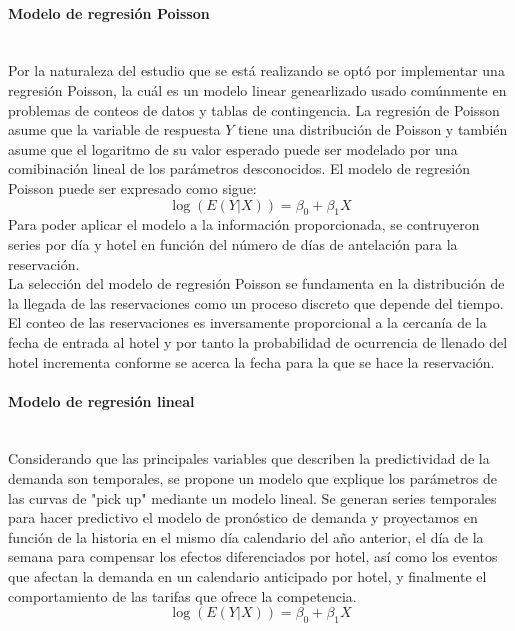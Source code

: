 \documentclass{article}\usepackage[]{graphicx}\usepackage[]{color}
\begin{document}
\paragraph{Modelo de regresión Poisson} ~\\
Por la naturaleza del estudio que se está realizando se optó por implementar una regresión Poisson, la cuál es un modelo linear genearlizado usado comúnmente en problemas de conteos de datos y tablas de contingencia. La regresión de Poisson asume que la variable de respuesta $Y$ tiene una distribución de Poisson y también asume que el logaritmo de su valor esperado puede ser modelado por una comibinación lineal de los parámetros desconocidos.
El modelo de regresión Poisson puede ser expresado como sigue:
$$\log(E(Y|X))=\beta_0 + \beta_1{X}$$
Para poder aplicar el modelo a la información proporcionada, se contruyeron series por día y hotel en función del número de días de antelación para la reservación.
~\\
La selección del modelo de regresión Poisson se fundamenta en la distribución de la llegada de las reservaciones como un proceso discreto que depende del tiempo. El conteo de las reservaciones es inversamente proporcional a la cercanía de la fecha de entrada al hotel y por tanto la probabilidad de ocurrencia de llenado del hotel incrementa conforme se acerca la fecha para la que se hace la reservación.

\paragraph{Modelo de regresión lineal} ~\\
Considerando que las principales variables que describen la predictividad de la demanda son temporales, se propone un modelo que explique los parámetros de las curvas de "pick up" mediante un modelo lineal. Se generan series temporales para hacer predictivo el modelo de pronóstico de demanda y proyectamos en función de la historia en el mismo día calendario del año anterior, el día de la semana para compensar los efectos diferenciados por hotel, así como los eventos que afectan la demanda en un calendario anticipado por hotel, y finalmente el comportamiento de las tarifas que ofrece la competencia.
$$\log(E(Y|X))=\beta_0 + \beta_1{X}$$
\end{document}
